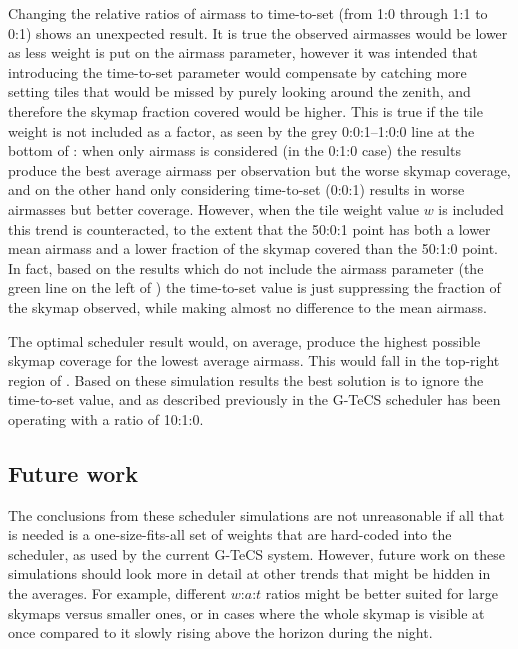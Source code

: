 \begin{colsection}
\begin{colsection}
Changing the relative ratios of airmass to time-to-set (from 1:0 through 1:1 to 0:1) shows an unexpected result. It is true the observed airmasses would be lower as less weight is put on the airmass parameter, however it was intended that introducing the time-to-set parameter would compensate by catching more setting tiles that would be missed by purely looking around the zenith, and therefore the skymap fraction covered would be higher. This is true if the tile weight is not included as a factor, as seen by the grey 0:0:1--1:0:0 line at the bottom of : when only airmass is considered (in the 0:1:0 case) the results produce the best average airmass per observation but the worse skymap coverage, and on the other hand only considering time-to-set (0:0:1) results in worse airmasses but better coverage. However, when the tile weight value $w$ is included this trend is counteracted, to the extent that the 50:0:1 point has both a lower mean airmass and a lower fraction of the skymap covered than the 50:1:0 point. In fact, based on the results which do not include the airmass parameter (the green line on the left of ) the time-to-set value is just suppressing the fraction of the skymap observed, while making almost no difference to the mean airmass.

The optimal scheduler result would, on average, produce the highest possible skymap coverage for the lowest average airmass. This would fall in the top-right region of . Based on these simulation results the best solution is to ignore the time-to-set value, and as described previously in  the G-TeCS scheduler has been operating with a ratio of 10:1:0.

\end{colsection}


\subsection{Future work}
\label{sec:scheduler_sim_future}
\begin{colsection}

The conclusions from these scheduler simulations are not unreasonable if all that is needed is a one-size-fits-all set of weights that are hard-coded into the scheduler, as used by the current G-TeCS system. However, future work on these simulations should look more in detail at other trends that might be hidden in the averages. For example, different $w$:$a$:$t$ ratios might be better suited for large skymaps versus smaller ones, or in cases where the whole skymap is visible at once compared to it slowly rising above the horizon during the night.


\end{colsection}
\end{colsection}
